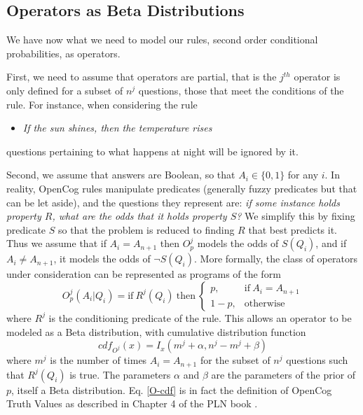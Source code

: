 \documentclass[runningheads]{llncs}
\begin{document}
\subsection{Operators as Beta Distributions}
\label{beta-op}
We have now what we need to model our rules, second order conditional
probabilities, as operators.

First, we need to assume that operators are partial, that is the
$j^{th}$ operator is only defined for a subset of $n^j$ questions,
those that meet the conditions of the rule. For instance, when
considering the rule
\begin{itemize}
\item {\it If the sun shines, then the temperature rises}
\end{itemize}
questions pertaining to what happens at night will be ignored by it.

Second, we assume that answers are Boolean, so that $A_i\in \{0, 1\}$
for any $i$. In reality, OpenCog rules manipulate predicates
(generally fuzzy predicates but that can be let aside), and the
questions they represent are: {\it if some instance holds property
  $R$, what are the odds that it holds property $S$?} We simplify this
by fixing predicate $S$ so that the problem is reduced to finding $R$
that best predicts it. Thus we assume that if $A_i=A_{n+1}$ then
$O^j_p$ models the odds of $S(Q_i)$, and if $A_i \neq A_{n+1}$, it
models the odds of $\neg S(Q_i)$. More formally, the class of
operators under consideration can be represented as programs of the
form
\begin{equation}
O^j_p(A_i|Q_i) = \text{if}\ R^j(Q_i)\ \text{then}\
\begin{cases}
  p, & \text{if}\ A_i = A_{n+1}\\
  1-p, & \text{otherwise}
\end{cases}
\end{equation}
where $R^j$ is the conditioning predicate of the rule. This allows an
operator to be modeled as a Beta distribution, with cumulative
distribution function
\begin{equation}
  \label{O-cdf}
  cdf_{O^j}(x) = I_x(m^j + \alpha, n^j-m^j+\beta)
\end{equation}
where $m^j$ is the number of times $A_i = A_{n+1}$ for the subset of
$n^j$ questions such that $R^j(Q_i)$ is true. The parameters $\alpha$
and $\beta$ are the parameters of the prior of $p$, itself a Beta
distribution. Eq. \ref{O-cdf} is in fact the definition of OpenCog
Truth Values as described in Chapter 4 of the PLN book
\cite{Goertzel09PLN}.
\end{document}
